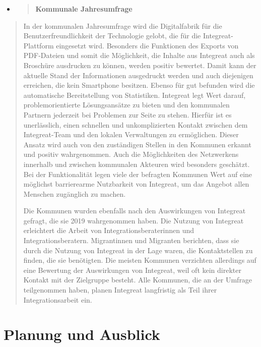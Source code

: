 \documentclass[12pt, a4paper]{article} %
\begin{document}
\begin{itemize}
\item
  \begin{quote}
  \textbf{Kommunale Jahresumfrage}
  \end{quote}
\end{itemize}

\begin{quote}
In der kommunalen Jahresumfrage wird die Digitalfabrik für die
Benutzerfreundlichkeit der Technologie gelobt, die für die
Integreat-Plattform eingesetzt wird. Besonders die Funktionen des
Exports von PDF-Dateien und somit die Möglichkeit, die Inhalte aus
Integreat auch als Broschüre ausdrucken zu können, werden positiv
bewertet. Damit kann der aktuelle Stand der Informationen ausgedruckt
werden und auch diejenigen erreichen, die kein Smartphone besitzen.
Ebenso für gut befunden wird die automatische Bereitstellung von
Statistiken. Integreat legt Wert darauf, problemorientierte
Lösungsansätze zu bieten und den kommunalen Partnern jederzeit bei
Problemen zur Seite zu stehen. Hierfür ist es unerlässlich, einen
schnellen und unkomplizierten Kontakt zwischen dem Integreat-Team und
den lokalen Verwaltungen zu ermöglichen. Dieser Ansatz wird auch von den
zuständigen Stellen in den Kommunen erkannt und positiv wahrgenommen.
Auch die Möglichkeiten des Netzwerkens innerhalb und zwischen kommunalen
Akteuren wird besonders geschätzt. Bei der Funktionalität legen viele
der befragten Kommunen Wert auf eine möglichst barrierearme Nutzbarkeit
von Integreat, um das Angebot allen Menschen zugänglich zu machen.

Die Kommunen wurden ebenfalls nach den Auswirkungen von Integreat
gefragt, die sie 2019 wahrgenommen haben. Die Nutzung von Integreat
erleichtert die Arbeit von Integrationsberaterinnen und
Integrationsberatern. Migrantinnen und Migranten berichten, dass sie
durch die Nutzung von Integreat in der Lage waren, die Kontaktstellen zu
finden, die sie benötigten. Die meisten Kommunen verzichten allerdings
auf eine Bewertung der Auswirkungen von Integreat, weil oft kein
direkter Kontakt mit der Zielgruppe besteht. Alle Kommunen, die an der
Umfrage teilgenommen haben, planen Integreat langfristig als Teil ihrer
Integrationsarbeit ein.
\end{quote}

\hypertarget{planung-und-ausblick}{%
\section{Planung und Ausblick}\label{planung-und-ausblick}}
\end{document}

